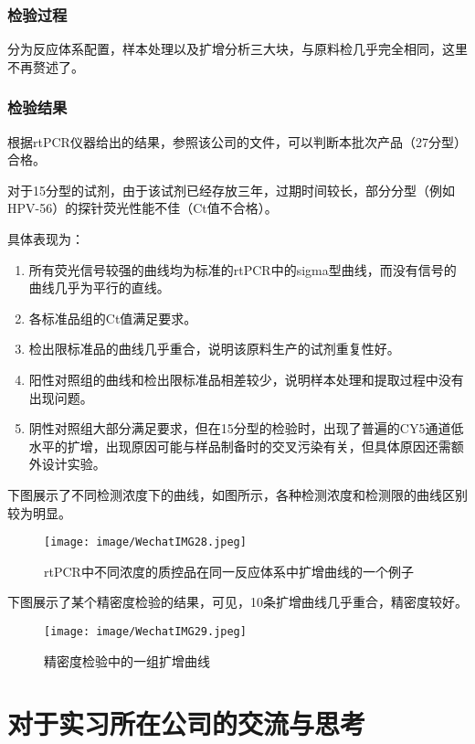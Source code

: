 \subsubsection{检验过程}
分为反应体系配置，样本处理以及扩增分析三大块，与原料检几乎完全相同，这里不再赘述了。

\subsubsection{检验结果}
根据rtPCR仪器给出的结果，参照该公司的文件，可以判断本批次产品（27分型）合格。

对于15分型的试剂，由于该试剂已经存放三年，过期时间较长，部分分型（例如HPV-56）的探针荧光性能不佳（Ct值不合格）。

具体表现为：
\begin{enumerate}
    \item 所有荧光信号较强的曲线均为标准的rtPCR中的sigma型曲线，而没有信号的曲线几乎为平行的直线。
    \item 各标准品组的Ct值满足要求。
    \item 检出限标准品的曲线几乎重合，说明该原料生产的试剂重复性好。
    \item 阳性对照组的曲线和检出限标准品相差较少，说明样本处理和提取过程中没有出现问题。
    \item 阴性对照组大部分满足要求，但在15分型的检验时，出现了普遍的CY5通道低水平的扩增，出现原因可能与样品制备时的交叉污染有关，但具体原因还需额外设计实验。
\end{enumerate}

下图展示了不同检测浓度下的曲线，如图所示，各种检测浓度和检测限的曲线区别较为明显。
\begin{figure}[H]
    \centering
    \texttt{[image: image/WechatIMG28.jpeg]}
    \caption{rtPCR中不同浓度的质控品在同一反应体系中扩增曲线的一个例子}
    \label{rtres}
\end{figure}

下图展示了某个精密度检验的结果，可见，10条扩增曲线几乎重合，精密度较好。
\begin{figure}[H]
    \centering
    \texttt{[image: image/WechatIMG29.jpeg]}
    \caption{精密度检验中的一组扩增曲线}
    \label{rtres}
\end{figure}





\section{对于实习所在公司的交流与思考}

